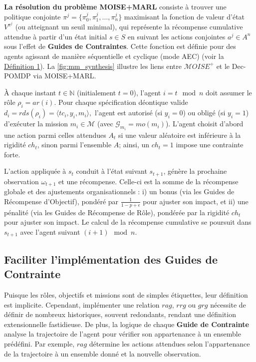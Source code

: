 \documentclass[final]{jfsma}
\begin{document}
\textbf{La résolution du problème MOISE+MARL} consiste à trouver une politique conjointe
$
  \pi^j = \{\pi^j_0, \pi^j_1, \dots, \pi^j_n\}
$
maximisant la fonction de valeur d'état \(V^{\pi^j}\) (ou atteignant un seuil minimal), qui représente la récompense cumulative attendue à partir d'un état initial \(s \in S\) en suivant les actions conjointes \(a^j \in A^n\) sous l'effet de \textbf{Guides de Contraintes}. Cette fonction est définie pour des agents agissant de manière séquentielle et cyclique (mode AEC) (voir la \hyperref[eq:single_value_function]{Définition 1}). La \autoref{fig:mm_synthesis} illustre les liens entre \(\mathcal{M}OISE^+\) et le Dec-POMDP via MOISE+MARL.

À chaque instant \(t \in \mathbb{N}\) (initialement \(t=0\)), l'agent \(i = t \mod n\) doit assumer le rôle \(\rho_i = ar(i)\). Pour chaque spécification déontique valide
$
  d_i = rds(\rho_i) = \langle tc_i, y_i, m_i \rangle,
$
l'agent est autorisé (si \(y_i=0\)) ou obligé (si \(y_i=1\)) d'exécuter la mission \(m_i \in \mathcal{M}\) (avec \(\mathcal{G}_{m_i} = mo(m_i)\)). L'agent choisit d'abord une action parmi celles attendues \(A_t\) si une valeur aléatoire est inférieure à la rigidité \(ch_t\), sinon parmi l'ensemble \(A\); ainsi, un \(ch_t = 1\) impose une contrainte forte.

L'action appliquée à \(s_t\) conduit à l'état suivant \(s_{t+1}\), génère la prochaine observation \(\omega_{t+1}\) et une récompense. Celle-ci est la somme de la récompense globale et des ajustements organisationnels :
i) un bonus (via les Guides de Récompense d'Objectif), pondéré par \(\frac{1}{1-p+\epsilon}\) pour ajuster son impact, et
ii) une pénalité (via les Guides de Récompense de Rôle), pondérée par la rigidité \(ch_t\) pour ajuster son impact.
Le calcul de la récompense cumulative se poursuit dans \(s_{t+1}\) avec l'agent suivant \((i+1) \mod n\).

\subsection{Faciliter l'implémentation des \textbf{Guides de Contrainte}}

Puisque les rôles, objectifs et missions sont de simples étiquettes, leur définition est implicite. Cependant, implémenter une relation \(rag\), \(rrg\) ou \(grg\) nécessite de définir de nombreux historiques, souvent redondants, rendant une définition extensionnelle fastidieuse. De plus, la logique de chaque \textbf{Guide de Contrainte} analyse la trajectoire de l'agent pour vérifier son appartenance à un ensemble prédéfini. Par exemple, \(rag\) détermine les actions attendues selon l'appartenance de la trajectoire à un ensemble donné et la nouvelle observation.
\end{document}
